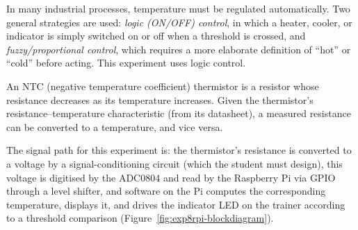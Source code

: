 \begin{introduction}
  In many industrial processes, temperature must be regulated automatically. Two general strategies are used: \textit{logic (ON/OFF) control}, in which a heater, cooler, or indicator is simply switched on or off when a threshold is crossed, and \textit{fuzzy/proportional control}, which requires a more elaborate definition of ``hot'' or ``cold'' before acting. This experiment uses logic control.
  \vspace*{1.5em}

  An NTC (negative temperature coefficient) thermistor is a resistor whose resistance decreases as its temperature increases. Given the thermistor's resistance--temperature characteristic (from its datasheet), a measured resistance can be converted to a temperature, and vice versa.
  \vspace*{1.5em}

  The signal path for this experiment is: the thermistor's resistance is converted to a voltage by a signal-conditioning circuit (which the student must design), this voltage is digitised by the ADC0804 and read by the Raspberry Pi via GPIO through a level shifter, and software on the Pi computes the corresponding temperature, displays it, and drives the indicator LED on the trainer according to a threshold comparison (Figure~\ref{fig:exp8rpi-blockdiagram}).
\end{introduction}

\begin{boxedfigure}
  \centering
  \label{fig:exp8rpi-blockdiagram}
\end{boxedfigure}

